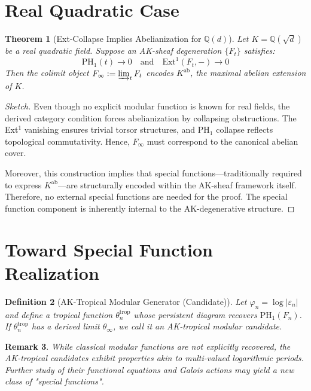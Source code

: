 \documentclass[11pt]{article}
\newtheorem{theorem}{Theorem}[section]
\newtheorem{definition}[theorem]{Definition}
\newtheorem{remark}[theorem]{Remark}
\begin{document}
\section{Real Quadratic Case}

\begin{theorem}[Ext-Collapse Implies Abelianization for $\mathbb{Q}(d)$]
Let $K = \mathbb{Q}(\sqrt{d})$ be a real quadratic field. Suppose an AK-sheaf degeneration $\{F_t\}$ satisfies:
\[
\mathrm{PH}_1(t) \to 0 \quad \text{and} \quad \mathrm{Ext}^1(F_t, -) \to 0
\]
Then the colimit object $F_\infty := \varinjlim_t F_t$ encodes $K^{\text{ab}}$, the maximal abelian extension of $K$.
\end{theorem}

\begin{proof}[Sketch]
Even though no explicit modular function is known for real fields, the derived category condition forces abelianization by collapsing obstructions. The Ext$^1$ vanishing ensures trivial torsor structures, and PH$_1$ collapse reflects topological commutativity. Hence, $F_\infty$ must correspond to the canonical abelian cover.

Moreover, this construction implies that special functions—traditionally required to express $K^{\text{ab}}$—are structurally encoded within the AK-sheaf framework itself. Therefore, no external special functions are needed for the proof. The special function component is inherently internal to the AK-degenerative structure.
\end{proof}

\section{Toward Special Function Realization}

\begin{definition}[AK-Tropical Modular Generator (Candidate)]
Let $\varphi_n = \log |\varepsilon_n|$ and define a tropical function $\theta_n^{\text{trop}}$ whose persistent diagram recovers $\mathrm{PH}_1(F_n)$. If $\theta_n^{\text{trop}}$ has a derived limit $\theta_\infty$, we call it an AK-tropical modular candidate.
\end{definition}

\begin{remark}
While classical modular functions are not explicitly recovered, the AK-tropical candidates exhibit properties akin to multi-valued logarithmic periods. Further study of their functional equations and Galois actions may yield a new class of "special functions".
\end{remark}
\end{document}

